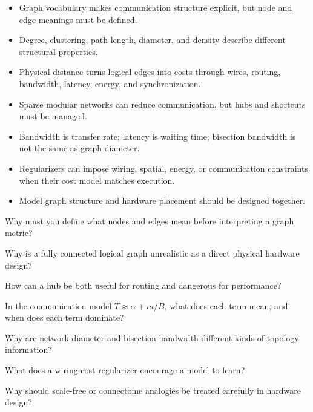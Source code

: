 \begin{chaptersummary}
\begin{itemize}[leftmargin=*]
  \item Graph vocabulary makes communication structure explicit, but node and edge meanings must be defined.
  \item Degree, clustering, path length, diameter, and density describe different structural properties.
  \item Physical distance turns logical edges into costs through wires, routing, bandwidth, latency, energy, and synchronization.
  \item Sparse modular networks can reduce communication, but hubs and shortcuts must be managed.
  \item Bandwidth is transfer rate; latency is waiting time; bisection bandwidth is not the same as graph diameter.
  \item Regularizers can impose wiring, spatial, energy, or communication constraints when their cost model matches execution.
  \item Model graph structure and hardware placement should be designed together.
\end{itemize}
\end{chaptersummary}

\begin{conceptquestions}
\item Why must you define what nodes and edges mean before interpreting a graph metric?
\item Why is a fully connected logical graph unrealistic as a direct physical hardware design?
\item How can a hub be both useful for routing and dangerous for performance?
\item In the communication model \(T \approx \alpha + m/B\), what does each term mean, and when does each term dominate?
\item Why are network diameter and bisection bandwidth different kinds of topology information?
\item What does a wiring-cost regularizer encourage a model to learn?
\item Why should scale-free or connectome analogies be treated carefully in hardware design?
\end{conceptquestions}

